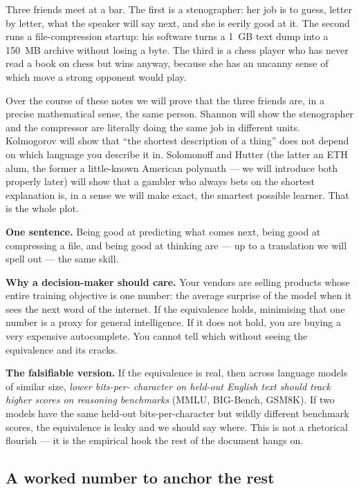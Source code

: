 \documentclass[12pt,a4paper]{article}
\theoremstyle{plain}
\theoremstyle{definition}
\begin{document}
Three friends meet at a bar. The first is a stenographer: her job is
to guess, letter by letter, what the speaker will say next, and she
is eerily good at it. The second runs a file-compression startup: his
software turns a 1~GB text dump into a 150~MB archive without losing
a byte. The third is a chess player who has never read a book on
chess but wins anyway, because she has an uncanny sense of which move
a strong opponent would play.

Over the course of these notes we will prove that the three friends
are, in a precise mathematical sense, the same person. Shannon will
show the stenographer and the compressor are literally doing the same
job in different units. Kolmogorov will show that ``the shortest
description of a thing'' does not depend on which language you
describe it in. Solomonoff and Hutter (the latter an ETH alum, the
former a little-known American polymath --- we will introduce both
properly later) will show that a gambler who always bets on the
shortest explanation is, in a sense we will make exact, the smartest
possible learner. That is the whole plot.

\begin{intuition}
\textbf{One sentence.} Being good at predicting what comes next,
being good at compressing a file, and being good at thinking are ---
up to a translation we will spell out --- the same skill.

\smallskip
\textbf{Why a decision-maker should care.} Your vendors are selling
products whose entire training objective is one number: the average
surprise of the model when it sees the next word of the internet.
If the equivalence holds, minimising that one number is a proxy for
general intelligence. If it does not hold, you are buying a very
expensive autocomplete. You cannot tell which without seeing the
equivalence and its cracks.

\smallskip
\textbf{The falsifiable version.} If the equivalence is real, then
across language models of similar size, \emph{lower bits-per-
character on held-out English text should track higher scores on
reasoning benchmarks} (MMLU, BIG-Bench, GSM8K). If two models have
the same held-out bits-per-character but wildly different benchmark
scores, the equivalence is leaky and we should say where. This is
not a rhetorical flourish --- it is the empirical hook the rest of
the document hangs on.
\end{intuition}

\subsection*{A worked number to anchor the rest}
\end{document}
